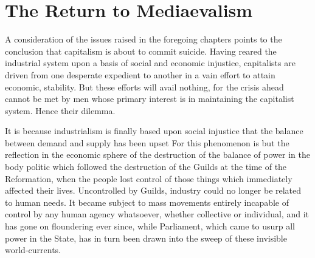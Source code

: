\documentclass{book}
\begin{document}
\chapter{The Return to Mediaevalism}
\label{chapter-3}
A consideration of the issues raised in the foregoing chapters points to the conclusion that capitalism is about to commit suicide. Having reared the industrial system upon a basis of social and economic injustice, capitalists are driven from one desperate expedient to another in a vain effort to attain economic, stability. But these efforts will avail nothing, for the crisis ahead cannot be met by men whose primary interest is in maintaining the capitalist system. Hence their dilemma.

It is because industrialism is finally based upon social injustice that the balance between demand and supply has been upset For this phenomenon is but the reflection in the economic sphere of the destruction of the balance of power in the body politic which followed the destruction of the Guilds at the time of the Reformation, when the people lost control of those things which immediately affected their lives. Uncontrolled by Guilds, industry could no longer be related to human needs. It became subject to mass movements entirely incapable of control by any human agency whatsoever, whether collective or individual, and it has gone on floundering ever since, while Parliament, which came to usurp all power in the State, has in turn been drawn into the sweep of these invisible world-currents.
\end{document}
